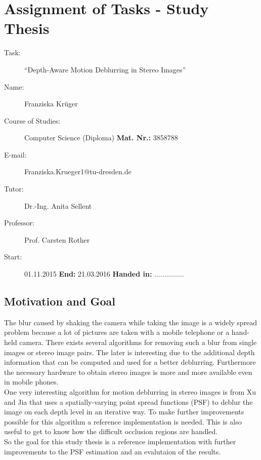 \documentclass[a4paper, 12pt]{scrartcl}
\begin{document}
\section*{Assignment of Tasks - Study Thesis}
\begin{description}
\item[Task:] \enquote{Depth-Aware Motion Deblurring in Stereo Images}
\\
\item[Name:] Franziska Krüger
\item[Course of Studies:] Computer Science (Diploma)  \hfill{\textbf{Mat. Nr.:} 3858788}
\item[E-mail:] Franziska.Krueger1@tu-dresden.de
\\
\item[Tutor:] Dr.-Ing. Anita Sellent
\item[Professor:] Prof. Carsten Rother
\item[Start:] 01.11.2015  \hfill{\textbf{End:} 21.03.2016} \hfill{\textbf{Handed in:} ...............}
\end{description}


\subsection*{Motivation and Goal}
The blur caused by shaking the camera while taking the image is a widely spread problem because a lot of pictures are taken with a mobile telephone or a hand-held camera. There exists several algorithms for removing such a blur from single images or stereo image pairs. The later is interesting due to the additional depth information that can be computed and used for a better deblurring. Furthermore the necessary hardware to obtain stereo images is more and more available even in mobile phones.\\
One very interesting algorithm for motion deblurring in stereo images is from Xu and Jia that uses a spatially-varying point spread functions (PSF) to deblur the image on each depth level in an iterative way. To make further improvements possible for this algorithm a reference implementation is needed. This is also useful to get to know how the difficult occlusion regions are handled.
\\
So the goal for this study thesis is a reference implementation with further improvements to the PSF estimation and an evalutaion of the results.
\end{document}
